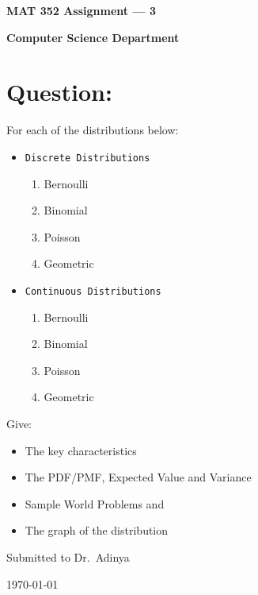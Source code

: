 \documentclass[a4paper]{article}
\begin{document}
    \begin{titlepage}

        \begin{center}
            \vspace*{1cm}

            \Huge
            \textbf{MAT 352 Assignment --- 3}

            \vspace{1.5cm}

            \textbf{Computer Science Department}

            \vspace{1cm}
            \Large
            \raggedright{
                \section*{Question:}
                For each of the distributions below:
                \begin{itemize}
                    \item \texttt{Discrete Distributions}
                        \begin{enumerate}
                            \item{Bernoulli}
                            \item{Binomial}
                            \item{Poisson}
                            \item{Geometric}
                        \end{enumerate}
                    \item \texttt{Continuous Distributions}
                        \begin{enumerate}
                            \item{Bernoulli}
                            \item{Binomial}
                            \item{Poisson}
                            \item{Geometric}
                        \end{enumerate}
                \end{itemize}
                Give:
                \begin{itemize}
                    \item{The key characteristics}
                    \item{The PDF/PMF, Expected Value and Variance}
                    \item{Sample World Problems and}
                    \item{The graph of the distribution}
                \end{itemize}
            }

            \vspace{2cm}
            \centering
            \large
            Submitted to Dr.\ Adinya

            \vspace{1cm}
            \today
            \normalsize
        \end{center}

    \end{titlepage}
\end{document}
